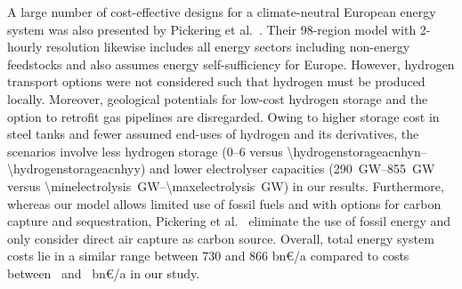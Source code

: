 A large number of cost-effective designs for a climate-neutral European energy
system was also presented by Pickering et
al.~\cite{pickeringDiversityOptions2022}. Their 98-region model with 2-hourly
resolution likewise includes all energy sectors including non-energy feedstocks
and also assumes energy self-sufficiency for Europe. However, hydrogen transport
options were not considered such that hydrogen must be produced locally.
Moreover, geological potentials for low-cost hydrogen storage and the option to
retrofit gas pipelines are disregarded. Owing to higher storage cost in steel
tanks and fewer assumed end-uses of hydrogen and its derivatives, the scenarios
involve less hydrogen storage (\SIrange{0}{6}{\twh} versus
\SIrange{\hydrogenstorageacnhyn}{\hydrogenstorageacnhyy}{\twh}) and lower
electrolyser capacities (\SIrange{290}{855}{\giga\watt} versus
\SIrange{\minelectrolysis}{\maxelectrolysis}{\giga\watt}) in our results.
Furthermore, whereas our model allows limited use of fossil fuels and with
options for carbon capture and sequestration, Pickering et
al.~\cite{pickeringDiversityOptions2022} eliminate the
use of fossil energy and only consider direct air capture as carbon
source. Overall, total energy system costs lie in a similar range between 730
and 866 bn\euro/a compared to costs between \minsystemcost~and
\maxsystemcost~bn\euro/a in our study.






